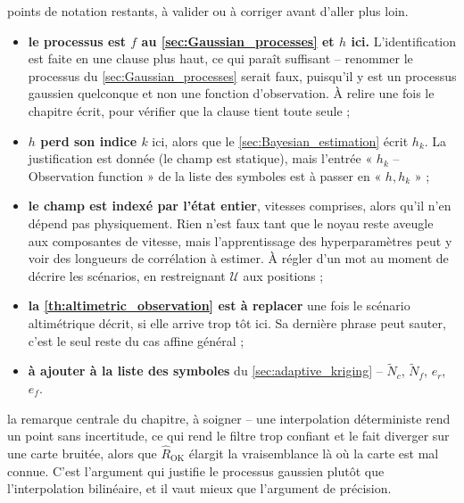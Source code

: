 {points de notation restants, à valider ou à corriger avant d'aller plus loin.}
\begin{itemize}
	\item \textbf{le processus est $f$ au \cref{sec:Gaussian_processes} et $h$ ici.} L'identification est faite en une clause plus haut, ce qui paraît suffisant -- renommer le processus du \cref{sec:Gaussian_processes} serait faux, puisqu'il y est un processus gaussien quelconque et non une fonction d'observation. À relire une fois le chapitre écrit, pour vérifier que la clause tient toute seule ;
	\item \textbf{$h$ perd son indice $k$} ici, alors que le \cref{sec:Bayesian_estimation} écrit $h_k$. La justification est donnée (le champ est statique), mais l'entrée « $h_k$ -- Observation function » de la liste des symboles est à passer en « $h,h_k$ » ;
	\item \textbf{le champ est indexé par l'état entier}, vitesses comprises, alors qu'il n'en dépend pas physiquement. Rien n'est faux tant que le noyau reste aveugle aux composantes de vitesse, mais l'apprentissage des hyperparamètres peut y voir des longueurs de corrélation à estimer. À régler d'un mot au moment de décrire les scénarios, en restreignant $\mathcal{U}$ aux positions ;
	\item \textbf{la \cref{th:altimetric_observation} est à replacer} une fois le scénario altimétrique décrit, si elle arrive trop tôt ici. Sa dernière phrase peut sauter, c'est le seul reste du cas affine général ;
	\item \textbf{à ajouter à la liste des symboles} du \cref{sec:adaptive_kriging} -- $\tilde{N}_c$, $\tilde{N}_f$, $e_r$, $e_f$.
\end{itemize}

{la remarque centrale du chapitre, à soigner -- une interpolation déterministe rend un point sans incertitude, ce qui rend le filtre trop confiant et le fait diverger sur une carte bruitée, alors que $\hat{R}_{\mathrm{OK}}$ élargit la vraisemblance là où la carte est mal connue. C'est l'argument qui justifie le processus gaussien plutôt que l'interpolation bilinéaire, et il vaut mieux que l'argument de précision.}

